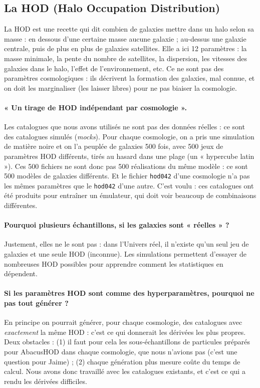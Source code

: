 \documentclass[11pt]{article}
\begin{document}
\subsection{La HOD (Halo Occupation Distribution)}
La HOD est une recette qui dit combien de galaxies mettre dans un halo selon sa masse : en dessous d'une certaine masse aucune galaxie ; au-dessus une galaxie centrale, puis de plus en plus de galaxies satellites. Elle a ici 12 paramètres : la masse minimale, la pente du nombre de satellites, la dispersion, les vitesses des galaxies dans le halo, l'effet de l'environnement, etc. Ce ne sont pas des paramètres cosmologiques : ils décrivent la formation des galaxies, mal connue, et on doit les marginaliser (les laisser libres) pour ne pas biaiser la cosmologie.

\paragraph{« Un tirage de HOD indépendant par cosmologie ».} Les catalogues que nous avons utilisés ne sont pas des données réelles : ce sont des catalogues simulés (\emph{mocks}). Pour chaque cosmologie, on a pris une simulation de matière noire et on l'a peuplée de galaxies 500 fois, avec 500 jeux de paramètres HOD différents, tirés au hasard dans une plage (un « hypercube latin »). Ces 500 fichiers ne sont donc pas 500 réalisations du même modèle : ce sont 500 modèles de galaxies différents. Et le fichier \texttt{hod042} d'une cosmologie n'a pas les mêmes paramètres que le \texttt{hod042} d'une autre. C'est voulu : ces catalogues ont été produits pour entraîner un émulateur, qui doit voir beaucoup de combinaisons différentes.

\paragraph{Pourquoi plusieurs échantillons, si les galaxies sont « réelles » ?} Justement, elles ne le sont pas : dans l'Univers réel, il n'existe qu'un seul jeu de galaxies et une seule HOD (inconnue). Les simulations permettent d'essayer de nombreuses HOD possibles pour apprendre comment les statistiques en dépendent.

\paragraph{Si les paramètres HOD sont comme des hyperparamètres, pourquoi ne pas tout générer ?} En principe on pourrait générer, pour chaque cosmologie, des catalogues avec \emph{exactement} la même HOD : c'est ce qui donnerait les dérivées les plus propres. Deux obstacles : (1) il faut pour cela les sous-échantillons de particules préparés pour AbacusHOD dans chaque cosmologie, que nous n'avions pas (c'est une question pour Jaime) ; (2) chaque génération plus mesure coûte du temps de calcul. Nous avons donc travaillé avec les catalogues existants, et c'est ce qui a rendu les dérivées difficiles.
\end{document}
